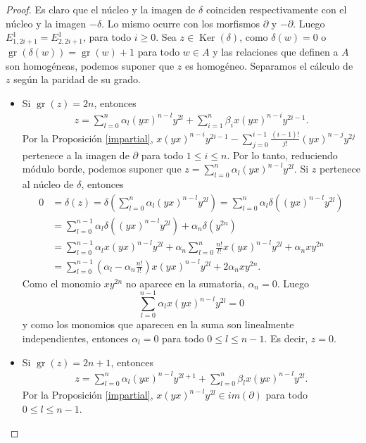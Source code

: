 \documentclass[a4paper,oneside,fleqn,11pt]{article}
\numberwithin{prop}{subsection}
\DeclareMathOperator\Ker{Ker}
\DeclareMathOperator\gr{gr}
\begin{document}
\begin{proof}
	Es claro que el núcleo y la imagen de $\delta$ coinciden respectivamente con el núcleo
	y la imagen $-\delta$. Lo mismo ocurre con los morfismos
	$\partial$ y $-\partial$. Luego $E_{1,2i + 1}^1 = E_{2, 2i + 1}^1$, para todo $i \geq 0$.
	Sea $z \in \Ker(\delta)$, como $\delta(w) = 0$ o $\gr(\delta(w)) = \gr(w) + 1$ para todo $w \in A$
	y las relaciones que definen a $A$ son homogéneas, podemos suponer que $z$ es homogéneo.
	Separamos el cálculo de $z$ según la paridad de su grado.
	\begin{itemize}
		\item Si $\gr(z) = 2n$, entonces
		\begin{align*}
			z = \sum_{l = 0}^n\alpha_l(yx)^{n - l}y^{2l} + \sum_{i = 1}^n\beta_ix(yx)^{n - i}y^{2i - 1}.
		\end{align*}
		Por la Proposición \ref{impartial}, $x(yx)^{n - i}y^{2i - 1} - \sum_{j = 0}^{i - 1}\frac{(i-1)!}{j!}(yx)^{n - j}y^{2j}$
		pertenece a la imagen de $\partial$ para todo $1 \leq i \leq n$.
		Por lo tanto, reduciendo módulo borde, podemos suponer que $z = \sum_{l = 0}^n\alpha_l(yx)^{n - l}y^{2l}$.
		Si $z$ pertenece al núcleo de $\delta$, entonces
		\begin{align*}
			0 &= \delta(z) = \delta\left(\sum_{l = 0}^n\alpha_l(yx)^{n - l}y^{2l}\right) = \sum_{l = 0}^n\alpha_l\delta((yx)^{n - l}y^{2l}) \\
			&= \sum_{l = 0}^{n - 1}\alpha_l\delta((yx)^{n - l}y^{2l}) + \alpha_n\delta(y^{2n}) \\
				&= \sum_{l = 0}^{n - 1}\alpha_lx(yx)^{n - l}y^{2l} + \alpha_n\sum_{l = 0}^n \frac{n!}{l!}x(yx)^{n - l}y^{2l} + \alpha_nxy^{2n} \\
				&= \sum_{l = 0}^{n - 1}(\alpha_l - \alpha_n\frac{n!}{l!}) x(yx)^{n - l}y^{2l} + 2\alpha_nxy^{2n}.
		\end{align*}	
		Como el monomio $xy^{2n}$ no aparece en la sumatoria, $\alpha_n = 0$.
		Luego
		\[
			\sum_{l = 0}^{n - 1}\alpha_lx(yx)^{n - l}y^{2l} = 0
		\]
		y como los monomios que aparecen en la suma son linealmente independientes, entonces $\alpha_l = 0$ para todo $0 \leq l \leq n -1$.
		Es decir, $z = 0$.
		\item Si $\gr(z) = 2n + 1$, entonces
		\begin{align*}
			z = \sum_{l = 0}^n\alpha_l(yx)^{n - l}y^{2l + 1} + \sum_{l = 0}^n\beta_lx(yx)^{n - l}y^{2l}.
		\end{align*}
		Por la Proposición \ref{impartial}, $x(yx)^{n - l}y^{2l} \in im(\partial)$ para todo $0 \leq l \leq n - 1$.

\end{itemize}
\end{proof}
\end{document}

